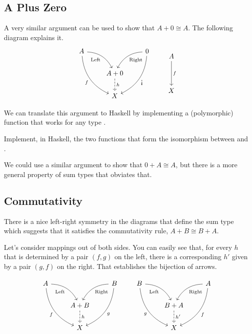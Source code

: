 \documentclass[DaoFP]{subfiles}
\begin{document}
\subsection{A Plus Zero}
A very similar argument can be used to show that $A + 0 \cong A$. The following diagram explains it.
\[
 \begin{tikzcd}
 A
 \arrow[dr,  bend left, "\text{Left}"']
 \arrow[ddr, bend right, "f"']
 && 0
 \arrow[dl, bend right, "\text{Right}"]
 \arrow[ddl, bend left, "\mbox{!`}"]
 \\
&A + 0
\arrow[d, dashed, "h"]
\\
& X
 \end{tikzcd}
 \qquad
 \begin{tikzcd}
 A
 \arrow[dd, "f"]
 \\
 \\
 X
 \end{tikzcd}
\]

We can translate this argument to Haskell by implementing a (polymorphic) function  that works for any type . 

\begin{exercise}
Implement, in Haskell, the two functions that form the isomorphism between  and .
\end{exercise}

We could use a similar argument to show that $0 + A \cong A$, but there is a more general property of sum types that obviates that.
\subsection{Commutativity}

There is a nice left-right symmetry in the diagrams that define the sum type which suggests that it satisfies the commutativity rule, $A + B \cong B + A$. 

Let's consider mappings out of both sides. You can easily see that, for every $h$ that is determined by a pair $(f, g)$ on the left, there is a corresponding $h'$ given by a pair $(g, f)$ on the right. That establishes the bijection of arrows.

\[
 \begin{tikzcd}
 A
 \arrow[dr,  bend left, "\text{Left}"']
 \arrow[ddr, bend right, "f"']
 && B
 \arrow[dl, bend right, "\text{Right}"]
 \arrow[ddl, bend left, "g"]
 \\
&A + B
\arrow[d, dashed, "h"]
\\
& X
 \end{tikzcd}
 \qquad
 \begin{tikzcd}
 B
 \arrow[dr,  bend left, "\text{Left}"']
 \arrow[ddr, bend right, "g"']
 && A
 \arrow[dl, bend right, "\text{Right}"]
 \arrow[ddl, bend left, "f"]
 \\
&B + A
\arrow[d, dashed, "h'"]
\\
& X
 \end{tikzcd}
\]
\end{document}
